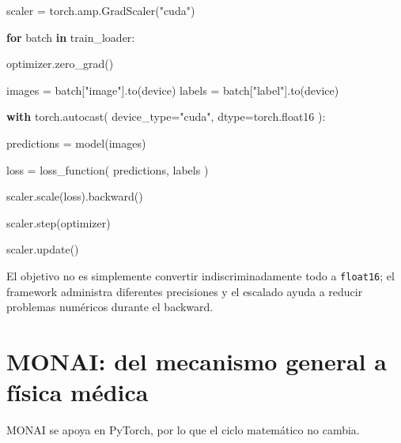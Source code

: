 \documentclass[
  letterpaper,
  DIV=11,
  numbers=noendperiod]{scrartcl}
\newenvironment{Shaded}{\begin{snugshade}}{\end{snugshade}}
\newcommand{\ControlFlowTok}[1]{\textcolor[rgb]{0.00,0.23,0.31}{\textbf{#1}}}
\newcommand{\KeywordTok}[1]{\textcolor[rgb]{0.00,0.23,0.31}{\textbf{#1}}}
\newcommand{\NormalTok}[1]{\textcolor[rgb]{0.00,0.23,0.31}{#1}}
\newcommand{\OperatorTok}[1]{\textcolor[rgb]{0.37,0.37,0.37}{#1}}
\newcommand{\StringTok}[1]{\textcolor[rgb]{0.13,0.47,0.30}{#1}}
\begin{document}
\begin{Shaded}
\begin{Highlighting}[]
\NormalTok{scaler }\OperatorTok{=}\NormalTok{ torch.amp.GradScaler(}\StringTok{"cuda"}\NormalTok{)}

\ControlFlowTok{for}\NormalTok{ batch }\KeywordTok{in}\NormalTok{ train\_loader:}

\NormalTok{    optimizer.zero\_grad()}

\NormalTok{    images }\OperatorTok{=}\NormalTok{ batch[}\StringTok{"image"}\NormalTok{].to(device)}
\NormalTok{    labels }\OperatorTok{=}\NormalTok{ batch[}\StringTok{"label"}\NormalTok{].to(device)}

    \ControlFlowTok{with}\NormalTok{ torch.autocast(}
\NormalTok{        device\_type}\OperatorTok{=}\StringTok{"cuda"}\NormalTok{,}
\NormalTok{        dtype}\OperatorTok{=}\NormalTok{torch.float16}
\NormalTok{    ):}

\NormalTok{        predictions }\OperatorTok{=}\NormalTok{ model(images)}

\NormalTok{        loss }\OperatorTok{=}\NormalTok{ loss\_function(}
\NormalTok{            predictions,}
\NormalTok{            labels}
\NormalTok{        )}

\NormalTok{    scaler.scale(loss).backward()}

\NormalTok{    scaler.step(optimizer)}

\NormalTok{    scaler.update()}
\end{Highlighting}
\end{Shaded}

El objetivo no es simplemente convertir indiscriminadamente todo a
\texttt{float16}; el framework administra diferentes precisiones y el
escalado ayuda a reducir problemas numéricos durante el backward.

\section{MONAI: del mecanismo general a física
médica}\label{monai-del-mecanismo-general-a-fuxedsica-muxe9dica}

MONAI se apoya en PyTorch, por lo que el ciclo matemático no cambia.
\end{document}
